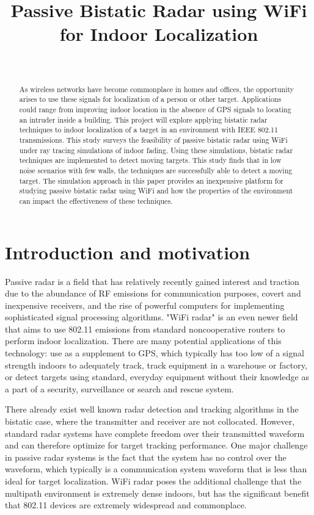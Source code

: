 \documentclass[article,11pt,onecolumn,final]{IEEEtran}
\title{Passive Bistatic Radar using WiFi for Indoor Localization}
\author{\IEEEauthorblockN{Alexander Tooke and Ernest Carozza}  \\
\IEEEauthorblockA{Department of Electrical and Computer Engineering\\ 
Boston University
}}
\begin{document}
\maketitle
\begin{abstract}
As wireless networks have become commonplace in homes and offices, the opportunity arises to use
these signals for localization of a person or other target. Applications could range from improving indoor
location in the absence of GPS signals to locating an intruder inside a building. This project will explore
applying bistatic radar techniques to indoor localization of a target in an environment with IEEE 802.11
transmissions. This study surveys the feasibility of passive bistatic radar
using WiFi under ray tracing simulations of indoor fading. Using these simulations, bistatic radar techniques are
implemented to detect moving targets. This study finds that in low noise scenarios with few walls, the
techniques are successfully able to detect a moving target. The simulation approach in this paper 
provides an inexpensive platform for studying passive bistatic radar using WiFi and how the properties of
the environment can impact the effectiveness of these techniques.
\end{abstract}

\section{Introduction and motivation} 
Passive radar is a field that has relatively recently gained interest and traction due to the abundance of
RF emissions for communication purposes, covert and inexpensive receivers, and the rise of powerful
computers for implementing sophisticated signal processing algorithms. "WiFi radar" is an even newer
field that aims to use 802.11 emissions from standard noncooperative routers to perform indoor
localization. There are many potential applications of this technology: use as a supplement to GPS,
which typically has too low of a signal strength indoors to adequately track, track equipment in a
warehouse or factory, or detect targets using standard, everyday equipment without their knowledge as
a part of a security, surveillance or search and rescue system.

There already exist well known radar detection and tracking algorithms in the bistatic case, where the
transmitter and receiver are not collocated. However, standard radar systems have complete freedom
over their transmitted waveform and can therefore optimize for target tracking performance. One major
challenge in passive radar systems is the fact that the system has no control over the waveform, which
typically is a communication system waveform that is less than ideal for target localization. WiFi radar
poses the additional challenge that the multipath environment is extremely dense indoors, but has the
significant benefit that 802.11 devices are extremely widespread and commonplace.
\end{document}
